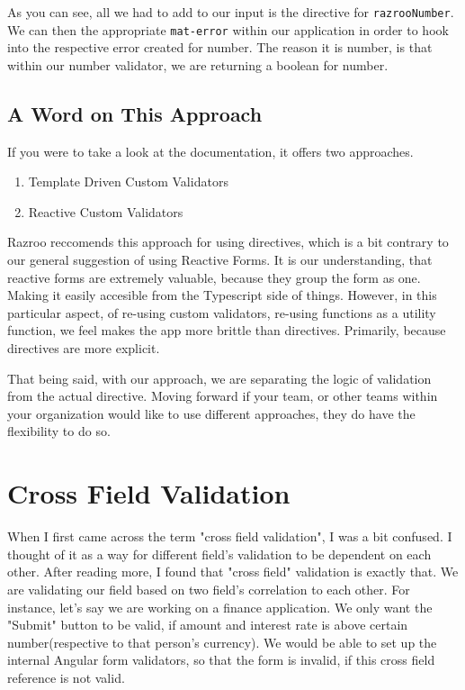 As you can see, all we had to add to our input is the directive for 
\lstinline{razrooNumber}. We can then the appropriate \lstinline{mat-error}
within our application in order to hook into the respective error created for number.
The reason it is number, is that within our number validator, we are returning a 
boolean for number. 

\subsection{A Word on This Approach}
If you were to take a look at the documentation, it offers two approaches.
\begin{enumerate}
  \item Template Driven Custom Validators 
  \item Reactive Custom Validators 
\end{enumerate}

Razroo reccomends this approach for using directives, which is a bit contrary to our 
general suggestion of using Reactive Forms. It is our understanding, that reactive 
forms are extremely valuable, because they group the form as one. Making it 
easily accesible from the Typescript side of things. However, in this
particular aspect, of re-using custom validators, re-using functions as a utility 
function, we feel makes the app more brittle than directives. Primarily, because 
directives are more explicit. 

That being said, with our approach, we are separating the logic of validation from 
the actual directive. Moving forward if your team, or other teams within your 
organization would like to use different approaches, they do have the flexibility
to do so. 

\section{Cross Field Validation}
When I first came across the term "cross field validation", I was a bit 
confused. I thought of it as a way for different field's validation to 
be dependent on each other. After reading more, I found that "cross 
field" validation is exactly that. We are validating our field based on 
two field's correlation to each other. For instance, let's say we are 
working on a finance application. We only want the "Submit" button to 
be valid, if amount and interest rate is above certain number(respective 
to that person's currency). We would be able to set up the internal Angular
form validators, so that the form is invalid, if this cross field reference 
is not valid. 


